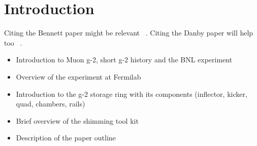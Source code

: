 \section{Introduction}
\label{sec:Introduction}
Citing the Bennett paper might be relevant ~\cite{Bennett2006}.
Citing the Danby paper will help too ~\cite{Danby2001}.

\begin{itemize}
\item Introduction to Muon g-2, short g-2 history and the BNL experiment
\item Overview of the experiment at Fermilab
\item Introduction to the g-2 storage ring with its components (inflector, kicker, quad, chambers, rails)
\item Brief overview of the shimming tool kit
\item Description of the paper outline
\end{itemize}
